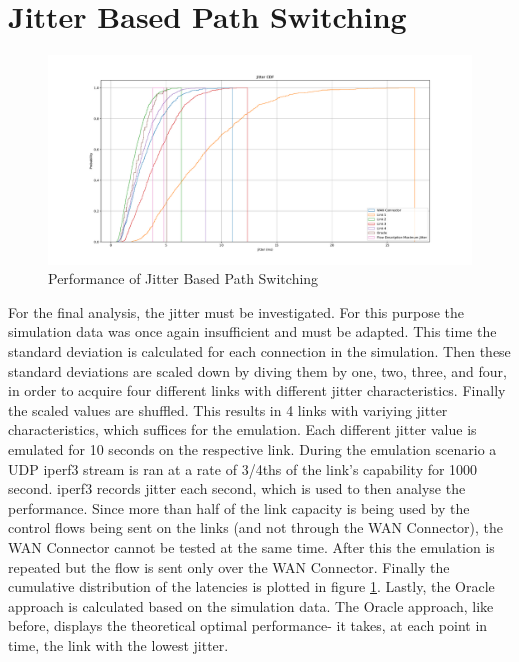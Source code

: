 \section{Jitter Based Path Switching}

\begin{figure}[h]
    \centering
        \includegraphics[height=0.66\textwidth,width=\textwidth]{fig/jitter_cdf.pdf}
        \caption{Performance of Jitter Based Path Switching}
        \label{fig:jitter_cdf}
\end{figure}

For the final analysis, the jitter must be investigated. For this purpose the simulation data was once again insufficient and must be adapted. This time the standard deviation is calculated for each connection in the simulation. Then these standard deviations are scaled down by diving them by one, two, three, and four, in order to acquire four different links with different jitter characteristics. Finally the scaled values are shuffled. This results in 4 links with variying jitter characteristics, which suffices for the emulation. Each different jitter value is emulated for 10 seconds on the respective link. During the emulation scenario a UDP iperf3 stream is ran at a rate of 3/4ths of the link's capability for 1000 second. iperf3 records jitter each second, which is used to then analyse the performance. Since more than half of the link capacity is being used by the control flows being sent on the links (and not through the WAN Connector), the WAN Connector cannot be tested at the same time. After this the emulation is repeated but the flow is sent only over the WAN Connector. Finally the cumulative distribution of the latencies is plotted in figure \ref{fig:jitter_cdf}. Lastly, the Oracle approach is calculated based on the simulation data. The Oracle approach, like before, displays the theoretical optimal performance- it takes, at each point in time, the link with the lowest jitter. 

